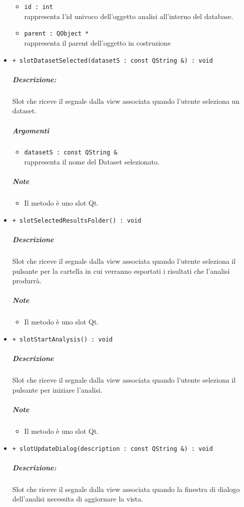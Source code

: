 \begin{itemize}
\begin{itemize}
				\item \color{RoyalPurple} \verb!id : int!\\				
\color{black} rappresenta l'id univoco dell'oggetto analisi all'interno del database.
				\item \color{RoyalPurple} \verb!parent : QObject *!\\				
\color{black} rappresenta il parent dell'oggetto in costruzione
			\end{itemize}
			\item \color{blue} \verb!+ slotDatasetSelected(datasetS : const QString &) : void!
			\color{black}
			\subparagraph{Descrizione:} Slot\g{} che riceve il segnale dalla view associata quando l'utente seleziona un dataset.
			\color{black}
			\subparagraph{Argomenti}
			\begin{itemize}
				\item \color{RoyalPurple} \verb!datasetS : const QString &!\\				
\color{black} rappresenta il nome del Dataset\g{} selezionato.
			\end{itemize}
			\subparagraph{Note}
			\begin{itemize}
				\item Il metodo è uno slot\g{} Qt\g{}.
			\end{itemize}
			\item \color{blue} \verb!+ slotSelectedResultsFolder() : void!
			\color{black}
			\subparagraph{Descrizione} Slot\g{} che riceve il segnale dalla view associata quando l'utente seleziona il pulsante per la cartella in cui verranno esportati i risultati che l'analisi produrrà.
			\subparagraph{Note}
			\begin{itemize}
				\item Il metodo è uno slot\g{} Qt\g{}.
			\end{itemize}
			\item \color{blue} \verb!+ slotStartAnalysis() : void!
			\color{black}
			\subparagraph{Descrizione} Slot\g{} che riceve il segnale dalla view associata quando l'utente seleziona il pulsante per iniziare l'analisi.
			\subparagraph{Note}
			\begin{itemize}
				\item Il metodo è uno slot\g{} Qt\g{}.
			\end{itemize}
			\item \color{blue} \verb!+ slotUpdateDialog(description : const QString &) : void!
			\color{black}
			\subparagraph{Descrizione:} Slot\g{} che riceve il segnale dalla view associata quando la finestra di dialogo dell'analisi necessita di aggiornare la vista.

\end{itemize}
